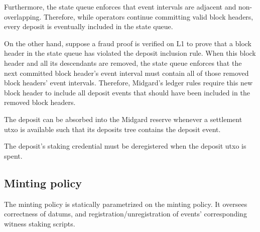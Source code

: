 \documentclass[../midgard.tex]{subfiles}
\begin{document}
Furthermore, the state queue enforces that event intervals are adjacent and non-overlapping.
Therefore, while operators continue committing valid block headers, every deposit is eventually included in the state queue.

On the other hand, suppose a fraud proof is verified on L1 to prove that a block header in the state queue has violated the deposit inclusion rule.
When this block header and all its descendants are removed, the state queue enforces that the next committed block header's event interval must contain all of those removed block headers' event intervals.
Therefore, Midgard's ledger rules require this new block header to include all deposit events that should have been included in the removed block headers.

The deposit can be absorbed into the Midgard reserve whenever a settlement utxo is available such that its deposits tree contains the deposit event.

The deposit's  staking credential must be deregistered when the deposit utxo is spent.

\subsection{Minting policy}
\label{h:deposit-minting-policy}

The  minting policy is statically parametrized on the  minting policy.
It oversees correctness of datums, and registration/unregistration of events' corresponding witness staking scripts.
\end{document}
